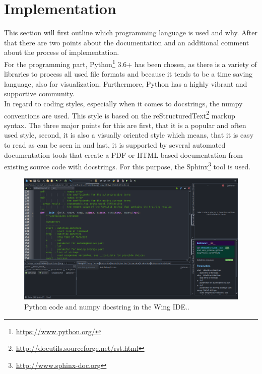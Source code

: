 \section{Implementation}
\label{sec:prog}

This section will first outline which programming language is used and why. After that there are two points about the documentation and an additional comment about the process of implementation.\\

For the programming part, Python\footnote{\url{https://www.python.org/}} 3.6+ has been chosen, as there is a variety of libraries to process all used file formats and because it tends to be a time saving language, also for visualization. Furthermore, Python has a highly vibrant and supportive community.\\

In regard to coding styles, especially when it comes to docstrings, the numpy conventions are used. This style is based on the reStructuredText\footnote{\url{http://docutils.sourceforge.net/rst.html}} markup syntax. The three major points for this are first, that it is a popular and often used style, second, it is also a visually oriented style which means, that it is easy to read as can be seen in  and last, it is supported by several automated documentation tools that create a PDF or HTML based documentation from existing source code with docstrings. For this purpose, the Sphinx\footnote{\url{http://www.sphinx-doc.org}} tool is used.\\

\begin{figure}[h!]%
\centering
\includegraphics[width=\textwidth]{logos/Predictions_Wing_001}%
\caption[Python code and numpy docstring in the Wing IDE.]{Python code and numpy docstring in the Wing IDE.\footnotemark.}%
\label{fig:wing_docstrings}%
\end{figure}

